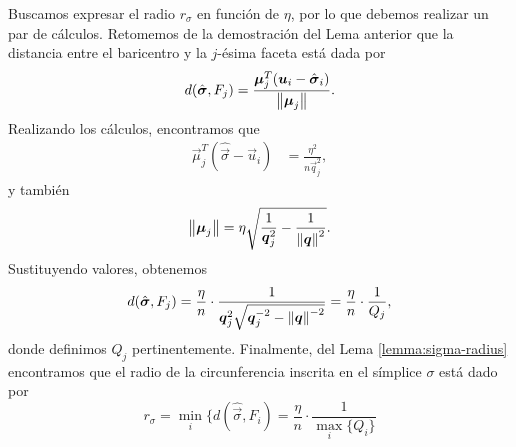 Buscamos expresar el radio $r_\sigma$ en función de $\eta$, por lo que debemos realizar un par de
cálculos. Retomemos de la demostración del Lema anterior que la distancia entre el baricentro y la
$j$-ésima faceta está dada por
\begin{equation*}
	d(\hat{\boldsymbol{\sigma}}, F_j) = \frac{{\boldsymbol{\mu}}_j^T(\boldsymbol{u}_i -
	\hat{\boldsymbol{\sigma}}_i)}{\left\lVert \boldsymbol{\mu}_j \right\rVert}.
\end{equation*}
Realizando los cálculos, encontramos que
\begin{align*}
	\vec{\mu}_j^T(\hat{\vec{\sigma}} - \vec{u}_i)
	&= \frac{\eta^2}{n\vec{q}_j^2},
\end{align*}
y también
\begin{equation*}
	\left\lVert \boldsymbol{\mu}_j \right\rVert = \eta \sqrt{\frac{1}{\boldsymbol{q}_j^2} - \frac{1}{\left\lVert \boldsymbol{q} \right\rVert^2}}.
\end{equation*}
Sustituyendo valores, obtenemos
\begin{equation*}
	d(\hat{\boldsymbol{\sigma}}, F_j) = \frac{\eta}{n} \cdot
	\frac{1}{\boldsymbol{q}_j^2\sqrt{\boldsymbol{q}_j^{-2} - \left\lVert \boldsymbol{q} \right\rVert^{-2}}}
	= \frac{\eta}{n} \cdot \frac{1}{Q_j},
\end{equation*}
donde definimos $Q_j$ pertinentemente. Finalmente, del Lema \ref{lemma:sigma-radius} encontramos que
el radio de la circunferencia inscrita en el símplice $\sigma$ está dado por
\begin{equation}
	\label{eq:sigma-radius}
	r_\sigma = \min_{i} \lbrace d(\hat{\vec{\sigma}}, F_i) = \frac{\eta}{n} \cdot \frac{1}{\max_{i}
	\lbrace Q_i \rbrace}
\end{equation}

